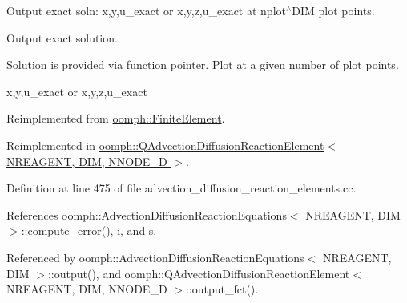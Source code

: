 Output exact soln\+: x,y,u\+\_\+exact or x,y,z,u\+\_\+exact at nplot$^\wedge$\+D\+IM plot points. 

Output exact solution.

Solution is provided via function pointer. Plot at a given number of plot points.

x,y,u\+\_\+exact or x,y,z,u\+\_\+exact 

Reimplemented from \hyperlink{classoomph_1_1FiniteElement_a22b695c714f60ee6cd145be348042035}{oomph\+::\+Finite\+Element}.



Reimplemented in \hyperlink{classoomph_1_1QAdvectionDiffusionReactionElement_a4dcfb4e1778ee7e46c86609ea4d1ce30}{oomph\+::\+Q\+Advection\+Diffusion\+Reaction\+Element$<$ N\+R\+E\+A\+G\+E\+N\+T, D\+I\+M, N\+N\+O\+D\+E\+\_\+D $>$}.



Definition at line 475 of file advection\+\_\+diffusion\+\_\+reaction\+\_\+elements.\+cc.



References oomph\+::\+Advection\+Diffusion\+Reaction\+Equations$<$ N\+R\+E\+A\+G\+E\+N\+T, D\+I\+M $>$\+::compute\+\_\+error(), i, and s.



Referenced by oomph\+::\+Advection\+Diffusion\+Reaction\+Equations$<$ N\+R\+E\+A\+G\+E\+N\+T, D\+I\+M $>$\+::output(), and oomph\+::\+Q\+Advection\+Diffusion\+Reaction\+Element$<$ N\+R\+E\+A\+G\+E\+N\+T, D\+I\+M, N\+N\+O\+D\+E\+\_\+D $>$\+::output\+\_\+fct().

\mbox{\label{classoomph_1_1AdvectionDiffusionReactionEquations_abfb9e33a5575df7f36cdee7e44b3d282}} 
